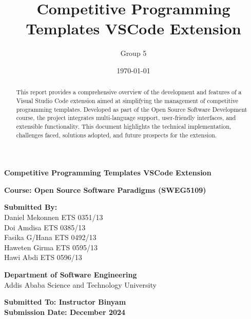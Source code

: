 \documentclass{article}
\title{Competitive Programming Templates VSCode Extension}
\author{Group 5}
\date{\today}
\begin{document}
\begin{titlepage}
    \begin{center}
        \vspace*{1cm}

        \textbf{\Huge Competitive Programming Templates VSCode Extension}

        \vspace{1.5cm}

        \textbf{\Large Course: Open Source Software Paradigms (SWEG5109)}

        \vspace{1.5cm}

        \textbf{\Large Submitted By:}
        \\
        Daniel Mekonnen ETS 0351/13
        \\
        Doi Amdisa  ETS 0385/13
        \\
        Fasika G/Hana   ETS 0492/13
        \\
        Haweten Girma   ETS 0595/13
        \\
        Hawi Abdi   ETS 0596/13

        \vspace{1cm}

        \textbf{\Large Department of Software Engineering}
        \\
        Addis Ababa Science and Technology University

        \vfill
        \textbf{\Large Submitted To: Instructor Binyam}\\
        \textbf{\Large Submission Date: December 2024}
    \end{center}
\end{titlepage}

\maketitle

\begin{abstract}
This report provides a comprehensive overview of the development and features of a Visual Studio Code extension aimed at simplifying the management of competitive programming templates. Developed as part of the Open Source Software Development course, the project integrates multi-language support, user-friendly interfaces, and extensible functionality. This document highlights the technical implementation, challenges faced, solutions adopted, and future prospects for the extension.
\end{abstract}
\end{document}
